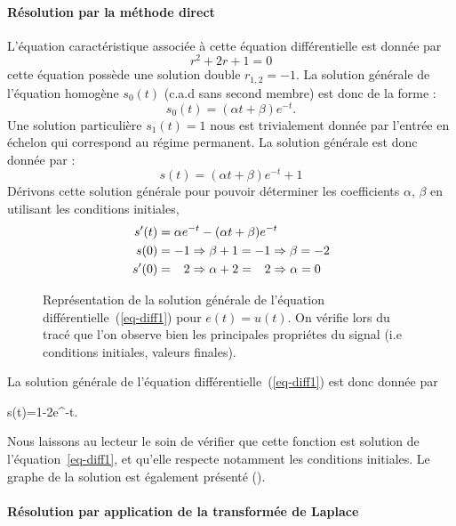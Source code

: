 \paragraph{Résolution par la méthode direct}
L'équation caractéristique associée à cette équation différentielle est 
donnée par 
$$
r^2+2r+1=0
$$
cette équation possède une solution double $r_{1,2}=-1$.
La solution générale de l'équation homogène $s_0(t)$ (c.a.d sans second membre) 
est donc de la forme :
$$
s_0(t)=(\alpha t+\beta)e^{-t}.
$$
Une solution particulière $s_1(t)=1$ nous est trivialement donnée par l'entrée 
en échelon qui correspond au régime permanent.
La solution générale est donc donnée par :
$$
s(t)=(\alpha t+\beta)e^{-t}+1
$$
Dérivons cette solution générale pour pouvoir déterminer les coefficients 
$\alpha$, $\beta$ en utilisant les conditions initiales,
\begin{align*}
    s'(t)&=\alpha e^{-t}-(\alpha t+\beta)e^{-t}\\
     s(0)&=-1\Rightarrow\beta+1=-1\Rightarrow\beta=-2 \\
    s'(0)&=\hphantom{-}2\Rightarrow\alpha+2=\hphantom{-}2\Rightarrow\alpha=0
\end{align*}

\begin{figure}[!t]
    \centering
    
    \caption{Représentation de la solution générale de l'équation 
             différentielle~(\ref{eq-diff1}) pour $e(t)=u(t)$. 
             On vérifie lors du tracé que l'on observe bien les principales 
             propriétes du signal (i.e conditions initiales, 
             valeurs finales).\label{fig-solution}}
\end{figure}

La solution générale de l'équation différentielle~(\ref{eq-diff1}) est 
donc donnée par 
\begin{bequation}
s(t)=1-2e^{-t}.
\end{bequation}
Nous laissons au lecteur le soin de vérifier que cette fonction est solution 
de l'équation~\ref{eq-diff1}, et qu'elle respecte notamment les conditions 
initiales. Le graphe de la solution est également présenté 
().

\paragraph{Résolution par application de la transformée de Laplace}

